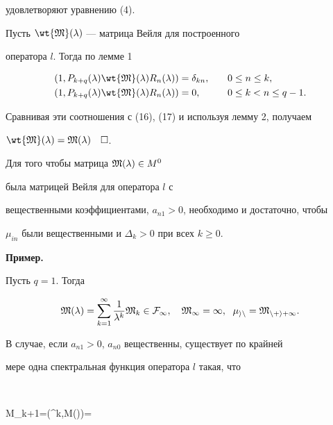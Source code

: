 удовлетворяют уравнению (4). 


 


Пусть $\wt{\frak M}(\lambda)$ --- матрица Вейля для построенного 


оператора $l$. Тогда по лемме 1 


\begin{alignat*}{2} 


(1,P_{k+q}(\lambda)\wt{\frak M}(\lambda)R_n(\lambda))&= 


\delta_{kn}, &\quad &0\le n\le k, \\ 


(1,P_{k+q}(\lambda)\wt{\frak M}(\lambda)R_n(\lambda))&=0, 


&\quad &0\le k<n\le q-1. 


\end{alignat*} 


Сравнивая эти соотношения с (16), (17) и используя лемму 2, получаем 


$\wt{\frak M}(\lambda)=\frak M(\lambda)\quad\square$. 


 


\begin{cor} 


Для того чтобы матрица $\frak M(\lambda)\in M^0$ 


была матрицей Вейля для оператора $l$ с 


вещественными коэффициентами, $a_{n1}>0$, необходимо и достаточно, чтобы 


$\mu_{in}$ были вещественными и $\Delta_k>0$ при всех $k\ge 0$. 


\end{cor} 


 


{\bf Пример.} 


Пусть $q=1$. Тогда 


$$ 


\frak M(\lambda)=\sum^\infty_{k=1}\frac{1}{\lambda^k} 


\frak M_k\in\cal F_1,\quad \frak M_1=1,\ \;\mu_{in}=\frak M_{n+i+1}. 


$$ 


В случае, если $a_{n1}>0$, $a_{n0}$ вещественны, существует по крайней 


мере одна спектральная функция оператора $l$ такая, что 


$$ 


\frak M_{k+1}=(\lambda^k,\frak M(\lambda))= 


